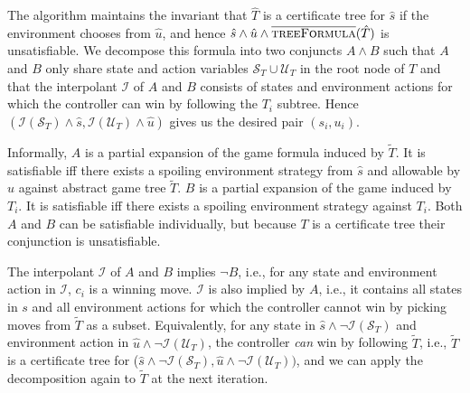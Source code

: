 The algorithm maintains the invariant that $\hat{T}$ is a certificate tree for $\hat{s}$ if the environment chooses from $\hat{u}$, and hence $\hat{s} \land \hat{u} \land \textsc{$\overline{\mbox{treeFormula}}$}(\hat{T})$ is unsatisfiable.  We decompose this formula into two conjuncts $A \land B$ such that $A$ and $B$ only share state and action variables $\mathcal{S}_T \cup \mathcal{U}_T$ in the root node of $T$ and that the interpolant $\mathcal{I}$ of $A$ and $B$ consists of states and environment actions for which the controller can win by following the $T_i$ subtree.  Hence $(\mathcal{I}(\mathcal{S}_T) \land \hat{s}, \mathcal{I}(\mathcal{U}_T) \land \hat{u})$ gives us the desired pair $(s_i, u_i)$.  

Informally, $A$ is a partial expansion of the game formula induced by $\tilde{T}$.  It is satisfiable iff there exists a spoiling environment strategy from $\hat{s}$ and allowable by $\hat{u}$ against abstract game tree $\tilde{T}$.  $B$ is a partial expansion of the game induced by $T_i$.  It is satisfiable iff there exists a spoiling environment strategy against $T_i$.  Both $A$ and $B$ can be satisfiable individually, but because $T$ is a certificate tree their conjunction is unsatisfiable.

The interpolant $\mathcal{I}$ of $A$ and $B$ implies $\neg B$, i.e., for any state and environment action in $\mathcal{I}$, $c_i$ is a winning move.  $\mathcal{I}$ is also implied by $A$, i.e., it contains all states in $s$ and all environment actions for which the controller cannot win by picking moves from $\tilde{T}$ as a subset.  Equivalently, for any state in $\hat{s} \land \neg \mathcal{I}(\mathcal{S}_T)$ and environment action in $\hat{u} \land \neg \mathcal{I}(\mathcal{U}_T)$, the controller \emph{can} win by following $\tilde{T}$, i.e., $\tilde{T}$ is a certificate tree for ($\hat{s} \land \neg \mathcal{I}(\mathcal{S}_T), \hat{u} \land \neg \mathcal{I}(\mathcal{U}_T))$, and we can apply the decomposition again to $\tilde{T}$ at the next iteration.


\makeatletter
\newcommand{\pushright}[1]{\ifmeasuring@#1\else\omit\hfill$\displaystyle#1$\fi\ignorespaces}
\makeatother

